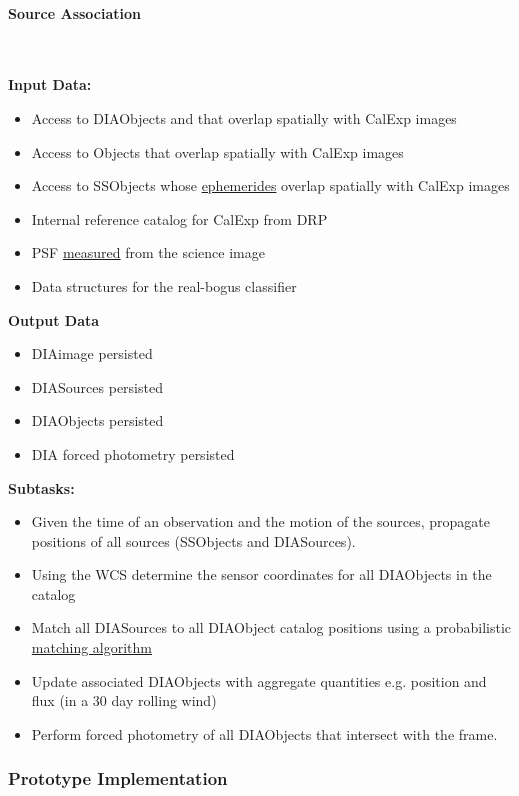 \paragraph{Source Association}~

{\bf Input Data:}\\
\begin{itemize}
\item Access to DIAObjects and that overlap spatially with CalExp images
\item Access to Objects that overlap spatially  with CalExp images
\item Access to SSObjects whose \hyperref[sec:acEphemerisCalculation]{ephemerides} overlap spatially with CalExp images
\item Internal reference catalog for CalExp from DRP
\item PSF \hyperref[sec:apSingleFrameProcessing]{measured} from the
  science image
\item Data structures for the real-bogus classifier
\end{itemize}


{\bf Output Data}\\
\begin{itemize}
\item DIAimage persisted
\item DIASources persisted
\item DIAObjects persisted
\item DIA forced photometry persisted
\end{itemize}
\noindent
{\bf Subtasks:}
\begin{itemize}
\item Given the time of an observation and the motion of the sources,
  propagate positions of all sources (SSObjects and DIASources).
\item Using the WCS determine the sensor coordinates for all
  DIAObjects in the catalog
\item Match all DIASources to all DIAObject catalog positions using a probabilistic \hyperref[sec:acDIAObjectGeneration]{matching algorithm}
\item Update associated DIAObjects with aggregate quantities
  e.g. position and flux (in a 30 day rolling wind)
\item Perform forced photometry of all DIAObjects that intersect with
  the frame.
\end{itemize}


\subsubsection{Prototype Implementation}

